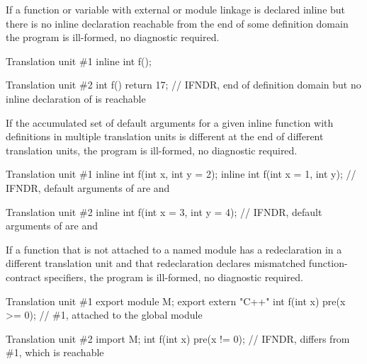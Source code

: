 
\pnum
If a function or variable
with external or module linkage
is declared inline
but there is no inline declaration
reachable from the end of some definition domain
the program is ill-formed, no diagnostic required.

\pnum
\begin{example}
\begin{codeblocktu}{Translation unit \#1}
inline int f();
\end{codeblocktu}
\begin{codeblocktu}{Translation unit \#2}
int f() { return 17; }
    // IFNDR, end of definition domain but no inline declaration of  is reachable
\end{codeblocktu}
\end{example}


\pnum
If the accumulated set of default arguments
for a given inline function
with definitions in multiple translation units
is different at the end
of different translation units,
the program is ill-formed, no diagnostic required.

\pnum
\begin{example}
\begin{codeblocktu}{Translation unit \#1}
inline int f(int x,     int y = 2);
inline int f(int x = 1, int y);
  // IFNDR, default arguments of  are  and 
\end{codeblocktu}
\begin{codeblocktu}{Translation unit \#2}
inline int f(int x = 3, int y = 4);
  // IFNDR, default arguments of  are  and 
\end{codeblocktu}
\end{example}


\pnum
If a function that is not attached to a named module
has a redeclaration in a different translation unit
and that redeclaration declares mismatched function-contract specifiers,
the program is ill-formed, no diagnostic required.

\pnum
\begin{example}
\begin{codeblocktu}{Translation unit \#1}
export module M;
export extern "C++" int f(int x) pre(x >= 0);   // \#1, attached to the global module
\end{codeblocktu}
\begin{codeblocktu}{Translation unit \#2}
import M;
int f(int x) pre(x != 0);       // IFNDR,  differs from \#1, which is reachable
\end{codeblocktu}
\end{example}


